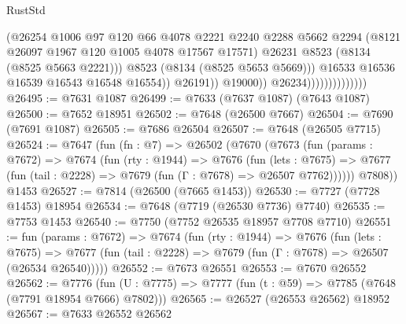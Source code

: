 \begin{lexlean}{RustStd}
\begin{coremodule}
                                              (@26254
                                                @1006
                                                @97
                                                @120
                                                @66
                                                @4078
                                                @2221
                                                @2240
                                                @2288
                                                @5662
                                                @2294
                                                (@8121 @26097 @1967 @120 @1005 @4078 @17567 @17571)
                                                @26231
                                                @8523
                                                (@8134 (@8525 @5663 @2221)))
                                              @8523
                                              (@8134 (@8525 @5653 @5669)))
                                            @16533
                                            @16536
                                            @16539
                                            @16543
                                            @16548
                                            @16554))
                                        @26191))
                                    @19000))
                                @26234))))))))))))))
@26495 := @7631 @1087
@26499 := @7633 (@7637 @1087) (@7643 @1087)
@26500 := @7652 @18951
@26502 := @7648 (@26500 @7667)
@26504 := @7690 (@7691 @1087)
@26505 := @7686 @26504
@26507 := @7648 (@26505 @7715)
@26524 := @7647
    (fun (fn : @7) =>
    @26502
      (@7670
        (@7673
          (fun (params : @7672) =>
          @7674
            (fun (rty : @1944) =>
            @7676
              (fun (lets : @7675) =>
              @7677 (fun (tail : @2228) => @7679 (fun (Γ : @7678) => @26507 @7762))))))
        @7808))
    @1453
@26527 := @7814 (@26500 (@7665 @1453))
@26530 := @7727 (@7728 @1453) @18954
@26534 := @7648 (@7719 (@26530 @7736) @7740)
@26535 := @7753 @1453
@26540 := @7750 (@7752 @26535 @18957 @7708 @7710)
@26551 := fun (params : @7672) =>
  @7674
    (fun (rty : @1944) =>
    @7676
      (fun (lets : @7675) =>
      @7677 (fun (tail : @2228) => @7679 (fun (Γ : @7678) => @26507 (@26534 @26540)))))
@26552 := @7673 @26551
@26553 := @7670 @26552
@26562 := @7776
    (fun (U : @7775) => @7777 (fun (t : @59) => @7785 (@7648 (@7791 @18954 @7666) @7802)))
@26565 := @26527 (@26553 @26562) @18952
@26567 := @7633 @26552 @26562

\end{coremodule}
\end{lexlean}
